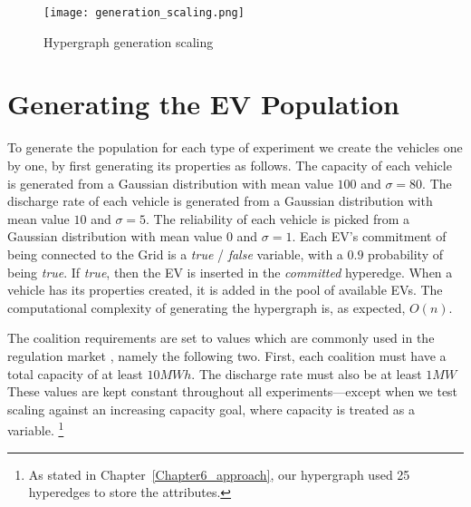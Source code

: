 \begin{figure}\centering
	\texttt{[image: generation\_scaling.png]}
	\vspace{10pt}
	\caption{Hypergraph generation scaling\label{fig:genscaling}}
\end{figure}

\section{Generating the EV Population}\label{sec:generating}
To generate the population for each type of experiment we create the vehicles one by one, by first generating its properties as follows. The capacity of each vehicle is generated from a Gaussian distribution with mean value $100$ and $\sigma = 80$. The discharge rate of each vehicle is generated from a Gaussian distribution with mean value $10$ and $\sigma=5$. The reliability of each vehicle is picked from a Gaussian distribution with mean value $0$ and $\sigma=1$. Each EV's commitment of being connected to the Grid is a {\em true} / {\em false} variable, with a $0.9$ probability of being {\em true}. If {\em true}, then the EV is inserted in the {\em committed} hyperedge. When a vehicle has its properties created, it is added in the pool of available EVs. The computational complexity of generating the hypergraph is, as expected, $O(n)$.

The coalition requirements are set to values which are commonly used in the regulation market \cite{kamboj2011deploying}, namely the following two. First, each coalition must have a total capacity of at least $10MWh$. The discharge rate must also be at least $1MW$ \cite{kamboj2011deploying}
These values are kept constant throughout all experiments---except when we test scaling against an increasing capacity goal, where capacity is treated as a variable.
\footnote{As stated in Chapter~\ref{Chapter6_approach}, our hypergraph used 25 hyperedges to store the attributes.}


